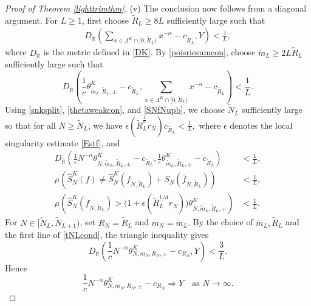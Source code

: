 \documentclass[11pt,twoside,a4paper,reqno]{amsart}
\newcommand{\as}[1]{\text{as } #1 \rightarrow\infty}
\begin{document}
\begin{proof}[Proof of Theorem \ref{lighttrimthm}]
(v)
The conclusion now follows from a diagonal argument. For $L\ge1$, first choose $\tilde R_L\ge 8L$ sufficiently large such that
\begin{align*}
D_{\overline{\mathbb R}}\left(\sum_{x\in \Lambda^K \cap [0,\tilde{R}_L)} x^{-\alpha}-c_{\tilde{R}_L}, Y\right) < \frac{1}{L},
\end{align*}
where $D_{\overline{\mathbb R}}$ is the metric defined in \eqref{DK}. By \eqref{poisriesumcon}, choose
$\tilde m_L\ge 2L\tilde R_L$ sufficiently large such that
\begin{equation*}
D_{\overline{\mathbb R}} \left(\frac{1}{c} \theta_{\tilde{m}_L,\tilde{R}_L,\pm}^K-c_{\tilde R_L},\sum_{x\in \Lambda^K \cap [0,\tilde{R}_L)}x^{-\alpha}-c_{\tilde R_L} \right) < \frac{1}{L}.
\end{equation*}
Using \eqref{snksplit}, \eqref{thetaweakcon}, and \eqref{SNfNupb}, we choose $\tilde{N}_L$ sufficiently large so that for all $N\ge \tilde N_L$, we have $\epsilon\left(\tilde{R}_L^{\frac{1}{d}} r_{N}\right) c_{\tilde{R}_L}<\frac{1}{L},$ where $\epsilon$ denotes the local singularity estimate \eqref{Estf}, and
\begin{equation}\label{tNLcond}
\begin{aligned}
D_{\overline{\mathbb R}}\left(\frac1cN^{-\alpha}\theta_{N,\tilde{m}_L,\tilde{R}_L,\pm}^K-c_{\tilde R_L}, \frac1c\theta_{\tilde{m}_L,\tilde{R}_L,\pm}^K-c_{\tilde R_L}\right) &< \frac{1}{L},\\
\mu\left(\hat{S}_N^K(f) \neq \hat{S}_N^K(f_{N,\tilde{R}_L}) + S_N(\bar{f}_{N,\tilde{R}_L})\right)&<\frac{1}{L},\\
\mu\left(\hat S_N^K(f_{N,\tilde R_L}) >\bigl(1+\epsilon(\tilde R_L^{1/d}r_N)\bigr)\theta_{N,\tilde m_L,\tilde R_L,+}^K\right) &<\frac1L.
\end{aligned}
\end{equation}
For $N\in [\tilde{N}_L, \tilde{N}_{L+1})$, set $R_N=\tilde{R}_L$ and $m_N=\tilde{m}_L.$ By the choice of $\tilde m_L,\tilde R_L$ and the first line of \eqref{tNLcond}, the triangle inequality gives
\begin{equation*}
D_{\overline{\mathbb R}}\left(\frac{1}{c} N^{-\alpha} \theta_{N,m_N,R_N,\pm}^K - c_{R_N}, Y\right)<\frac{3}{L}.
\end{equation*}
Hence
\begin{equation*}
\frac{1}{c} N^{-\alpha}\theta_{N,m_N,R_N,\pm}^K - c_{R_N}\Rightarrow Y \quad \as{N}.
\end{equation*}




\end{proof}
\end{document}

